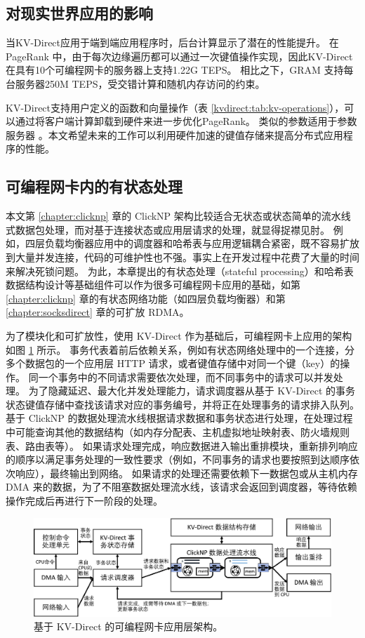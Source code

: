 \subsection{对现实世界应用的影响}

当KV-Direct应用于端到端应用程序时，后台计算显示了潜在的性能提升。 在PageRank \cite {page1999pagerank}中，由于每次边缘遍历都可以通过一次键值操作实现，因此KV-Direct在具有10个可编程网卡的服务器上支持1.22G TEPS。 相比之下，GRAM \cite {wu2015g}支持每台服务器250M TEPS，受交错计算和随机内存访问的约束。

KV-Direct支持用户定义的函数和向量操作（表 \ref {kvdirect:tab:kv-operations}），可以通过将客户端计算卸载到硬件来进一步优化PageRank。 类似的参数适用于参数服务器 \cite {li2014scaling}。本文希望未来的工作可以利用硬件加速的键值存储来提高分布式应用程序的性能。

\subsection{可编程网卡内的有状态处理}

本文第 \ref{chapter:clicknp} 章的 ClickNP 架构比较适合无状态或状态简单的流水线式数据包处理，而对基于连接状态或应用层请求的处理，就显得捉襟见肘。
例如，四层负载均衡器应用中的调度器和哈希表与应用逻辑耦合紧密，既不容易扩放到大量并发连接，代码的可维护性也不强。事实上在开发过程中花费了大量的时间来解决死锁问题。
为此，本章提出的有状态处理（stateful processing）和哈希表数据结构设计等基础组件可以作为很多可编程网卡应用的基础，如第 \ref{chapter:clicknp} 章的有状态网络功能（如四层负载均衡器）和第 \ref{chapter:socksdirect} 章的可扩放 RDMA。

为了模块化和可扩放性，使用 KV-Direct 作为基础后，可编程网卡上应用的架构如图 \ref{arch:fig:kvdirect_arch} 所示。
事务代表着前后依赖关系，例如有状态网络处理中的一个连接，分多个数据包的一个应用层 HTTP 请求，或者键值存储中对同一个键（key）的操作。
同一个事务中的不同请求需要依次处理，而不同事务中的请求可以并发处理。
为了隐藏延迟、最大化并发处理能力，请求调度器从基于 KV-Direct 的事务状态键值存储中查找该请求对应的事务编号，并将正在处理事务的请求排入队列。
基于 ClickNP 的数据处理流水线根据请求数据和事务状态进行处理，在处理过程中可能查询其他的数据结构（如内存分配表、主机虚拟地址映射表、防火墙规则表、路由表等）。
如果请求处理完成，响应数据进入输出重排模块，重新排列响应的顺序以满足事务处理的一致性要求（例如，不同事务的请求也要按照到达顺序依次响应），最终输出到网络。
如果请求的处理还需要依赖下一数据包或从主机内存 DMA 来的数据，为了不阻塞数据处理流水线，该请求会返回到调度器，等待依赖操作完成后再进行下一阶段的处理。


\begin{figure}[htbp]
	\centering
	\includegraphics[width=1.0\textwidth]{../figures/kvdirect_arch.pdf}
	\caption{基于 KV-Direct 的可编程网卡应用层架构。}
	\label{arch:fig:kvdirect_arch}
\end{figure}
